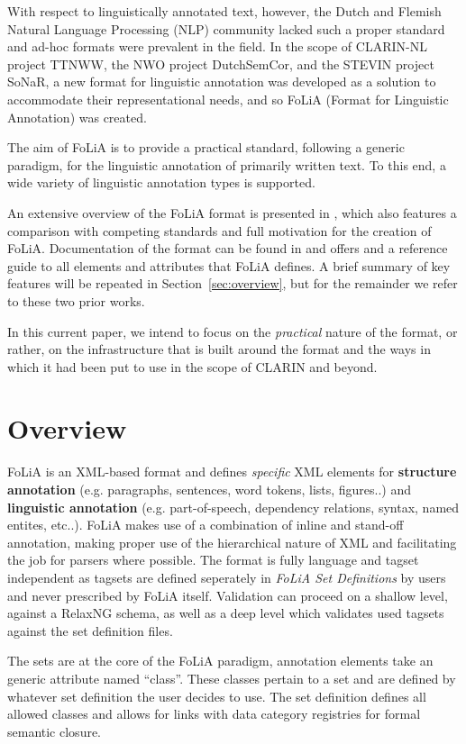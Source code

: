 \documentclass[a4paper,10pt,twoside]{article}
\begin{document}
With respect to linguistically annotated text, however, the Dutch and Flemish
Natural Language Processing (NLP) community lacked such a proper standard and ad-hoc formats were prevalent
in the field.  In the scope of CLARIN-NL project TTNWW, the NWO project
DutchSemCor, and the STEVIN project SoNaR, a new format for linguistic
annotation was developed as a solution to accommodate their representational needs, and so
FoLiA (Format for Linguistic Annotation) was created.

The aim of FoLiA is to provide a practical standard, following a generic
paradigm, for the linguistic annotation of primarily written text. To this end,
a wide variety of linguistic annotation types is supported. 

An extensive overview of the FoLiA format is presented in \cite{FOLIAPAPER},
which also features a comparison with competing standards and full motivation
for the creation of FoLiA. Documentation of the format  can be found in
\cite{FOLIADOC} and offers and a reference guide to all elements and attributes
that FoLiA defines.  A brief summary of key features will be repeated in
Section~\ref{sec:overview}, but for the remainder we refer to these two prior
works.

In this current paper, we intend to focus on the \emph{practical} nature of the
format, or rather, on the infrastructure that is built around the format and
the ways in which it had been put to use in the scope of CLARIN and beyond.

\section{Overview}

FoLiA is an XML-based format and defines \emph{specific} XML elements for \textbf{structure
annotation} (e.g. paragraphs, sentences, word tokens, lists, figures..) and
\textbf{linguistic annotation} (e.g. part-of-speech, dependency relations,
syntax, named entites, etc..). FoLiA makes use of a combination of inline and
stand-off annotation, making proper use of the hierarchical nature of XML and
facilitating the job for parsers where possible. The format is fully language and
tagset independent as tagsets are defined seperately in \emph{FoLiA Set Definitions}
by users and never prescribed by FoLiA itself. Validation can proceed
on a shallow level, against a RelaxNG schema, as well as a deep level which
validates used tagsets against the set definition files.

The sets are at the core of the FoLiA paradigm, annotation elements take an
generic attribute named ``class''. These classes pertain to a set and are
defined by whatever set definition the user decides to use. The set definition
defines all allowed classes and allows for links with data category registries
for formal semantic closure.
\end{document}
